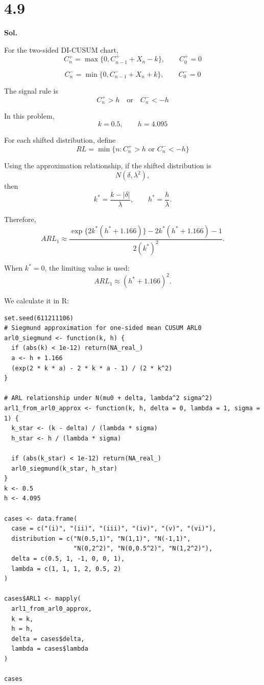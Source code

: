 \documentclass[a4paper, 12pt]{article}  %
\begin{document}
\section*{4.9}
\textbf{Sol.}

For the two-sided DI-CUSUM chart,
\[
C_n^+=\max\{0,C_{n-1}^+ + X_n-k\},
\qquad C_0^+=0
\]

\[
C_n^-=\min\{0,C_{n-1}^- + X_n+k\},
\qquad C_0^-=0
\]

The signal rule is
\[
C_n^+>h
\quad\text{or}\quad
C_n^-<-h
\]

In this problem,
\[
k=0.5,\qquad h=4.095
\]

For each shifted distribution, define
\[
RL=\min\{n:C_n^+>h \text{ or } C_n^-<-h\}
\]

Using the approximation relationship, if the shifted distribution is
\[
N(\delta,\lambda^2),
\]
then
\[
k^*=\frac{k-|\delta|}{\lambda},
\qquad
h^*=\frac{h}{\lambda}.
\]

Therefore,
\[
ARL_1 \approx
\frac{\exp\{2k^*(h^*+1.166)\}-2k^*(h^*+1.166)-1}
{2(k^*)^2}.
\]

When \(k^*=0\), the limiting value is used:
\[
ARL_1 \approx (h^*+1.166)^2.
\]

We calculate it in R:
\begin{codeblock}
\begin{verbatim}
set.seed(611211106)
# Siegmund approximation for one-sided mean CUSUM ARL0
arl0_siegmund <- function(k, h) {
  if (abs(k) < 1e-12) return(NA_real_)
  a <- h + 1.166
  (exp(2 * k * a) - 2 * k * a - 1) / (2 * k^2)
}

# ARL relationship under N(mu0 + delta, lambda^2 sigma^2)
arl1_from_arl0_approx <- function(k, h, delta = 0, lambda = 1, sigma = 1) {
  k_star <- (k - delta) / (lambda * sigma)
  h_star <- h / (lambda * sigma)

  if (abs(k_star) < 1e-12) return(NA_real_)
  arl0_siegmund(k_star, h_star)
}
k <- 0.5
h <- 4.095

cases <- data.frame(
  case = c("(i)", "(ii)", "(iii)", "(iv)", "(v)", "(vi)"),
  distribution = c("N(0.5,1)", "N(1,1)", "N(-1,1)",
                   "N(0,2^2)", "N(0,0.5^2)", "N(1,2^2)"),
  delta = c(0.5, 1, -1, 0, 0, 1),
  lambda = c(1, 1, 1, 2, 0.5, 2)
)

cases$ARL1 <- mapply(
  arl1_from_arl0_approx,
  k = k,
  h = h,
  delta = cases$delta,
  lambda = cases$lambda
)

cases
\end{verbatim}
\end{codeblock}
\end{document}
